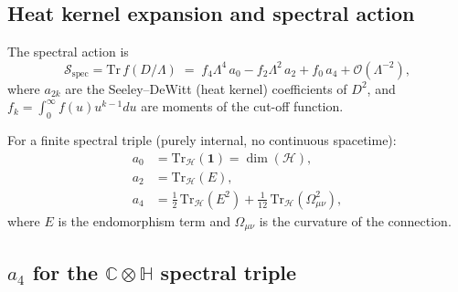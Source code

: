 \documentclass[11pt,a4paper]{article}
\theoremstyle{definition}
\theoremstyle{remark}
\begin{document}
\subsection{Heat kernel expansion and spectral action}

The spectral action is
\begin{equation}
  \mathcal{S}_{\mathrm{spec}} = \mathrm{Tr}\,f(D/\Lambda)
  \;=\; f_4\Lambda^4\,a_0 - f_2\Lambda^2\,a_2 + f_0\,a_4 + \mathcal{O}(\Lambda^{-2}),
  \label{eq:spectral_action}
\end{equation}
where $a_{2k}$ are the Seeley--DeWitt (heat kernel) coefficients of $D^2$,
and $f_k = \int_0^\infty f(u)u^{k-1}du$ are moments of the cut-off function.

For a finite spectral triple (purely internal, no continuous spacetime):
\begin{align}
  a_0 &= \mathrm{Tr}_{\mathcal{H}}(\mathbf{1}) = \dim(\mathcal{H}), \label{eq:a0}\\
  a_2 &= \mathrm{Tr}_{\mathcal{H}}(E), \label{eq:a2}\\
  a_4 &= \tfrac{1}{2}\,\mathrm{Tr}_{\mathcal{H}}(E^2) + \tfrac{1}{12}\,\mathrm{Tr}_{\mathcal{H}}(\Omega_{\mu\nu}^2), \label{eq:a4}
\end{align}
where $E$ is the endomorphism term and $\Omega_{\mu\nu}$ is the curvature of the
connection.

\subsection{$a_4$ for the $\mathbb{C}\otimes\mathbb{H}$ spectral triple}
\end{document}
